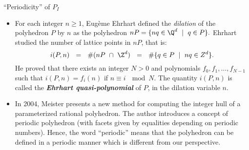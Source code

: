 \begin{frame}{``Periodicity'' of $P_I$}
	
	\begin{block}{}
		\begin{itemize}			
			\item For each integer $n \geq 1$,  Eug\`eme Ehrhart defined
			the {\textit{dilation}} of the polyhedron $P$ by $n$ as the
			polyhedron $nP = \{nq \in {\Q}^d \ \mid \ q \in P \}.$
			Ehrhart studied the number of
			lattice points in $nP$, that is:
			\begin{equation*}
				i(P, n) \ \ = \ \ \# (nP  \ \cap \  {\Z}^d ) \ \ = \ \
				\# \{ q \in P \ \mid \  nq \in {Z}^d \}.
			\end{equation*}
			He proved that 
			there exists an integer $N > 0$ and
			polynomials $f_0, f_1 ,  \ldots, f_{N-1}$
			such that $i(P, n) = f_i (n)$ if $n \equiv i \ \mod{N}.$
			The quantity 
			$i(P, n)$ is called the {\textbf{\textit{Ehrhart quasi-polynomial}}} of $P$,
			in the dilation variable $n$.
			
			\item In 2004, Meister presents a new method 
			for computing the integer hull of a parameterized rational polyhedron.
			The author introduces a concept of periodic polyhedron
			(with facets given by equalities depending on
			periodic numbers). Hence, the word ``periodic'' means that the polyhedron 
			can be defined in a periodic manner which is different from our perspective.
		\end{itemize}
		
	\end{block}
\end{frame}
